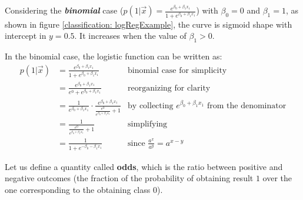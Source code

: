     Considering the \textbf{\textit{binomial}} case ($p(1|\vec{x}) =
    \frac{e^{\beta_0 + \beta_1 x_1}}{1+e^{\beta_0 + \beta_1 x_1}}$) with
    $\beta_0 = 0$ and $\beta_1 = 1$, as shown in figure \ref{classification:
    logRegExample}, the curve is sigmoid shape with intercept in $y=0.5$. It
    increases when the value of $\beta_1 > 0$.
    
    
    In the binomial case, the logistic function can be written as:
	\begin{align*}
	  p(1|\vec{x}) & = \frac{e^{\beta_0 + \beta_1 x_1}} {1+e^{\beta_0 + \beta_1 x_1}}
	               & \text{binomial case for simplicity} \\
	               & = \frac{e^{\beta_0 + \beta_1 x_1}} {e^0+e^{\beta_0 + \beta_1 x_1}}
	               & \text{reorganizing for clarity} \\
	               & = \frac{1}{e^{\beta_0 + \beta_1 x_1}} \cdot \frac{e^{\beta_0 + \beta_1 x_1}}{\frac{e^0}{e^{\beta_0 + \beta_1 x_1}} + 1}
	               & \text{by collecting } e^{\beta_0 + \beta_1 x_1} \text{ from the denominator}\\
	               & = \frac{1}{\frac{e^0}{e^{\beta_0 + \beta_1 x_1}} + 1} 
	               & \text{simplifying}\\ 
	               & = \frac{1}{1 + e^{-\beta_0 - \beta_1 x_1}}
	               & \text{since } \frac{a^x}{a^y} = a^{x-y}
	\end{align*}

	
    Let us define a quantity called \textbf{odds}, which is the ratio between
    positive and negative outcomes (the fraction of the probability of obtaining
    result $1$ over the one corresponding to the obtaining class $0$).

